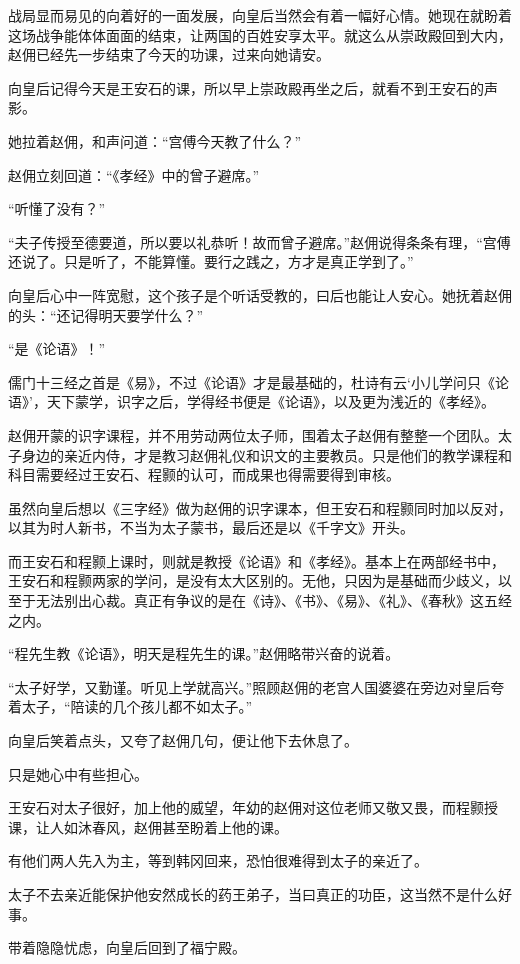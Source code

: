 战局显而易见的向着好的一面发展，向皇后当然会有着一幅好心情。她现在就盼着这场战争能体体面面的结束，让两国的百姓安享太平。就这么从崇政殿回到大内，赵佣已经先一步结束了今天的功课，过来向她请安。

向皇后记得今天是王安石的课，所以早上崇政殿再坐之后，就看不到王安石的声影。

她拉着赵佣，和声问道：“宫傅今天教了什么？”

赵佣立刻回道：“《孝经》中的曾子避席。”

“听懂了没有？”

“夫子传授至德要道，所以要以礼恭听！故而曾子避席。”赵佣说得条条有理，“宫傅还说了。只是听了，不能算懂。要行之践之，方才是真正学到了。”

向皇后心中一阵宽慰，这个孩子是个听话受教的，曰后也能让人安心。她抚着赵佣的头：“还记得明天要学什么？”

“是《论语》！”

 儒门十三经之首是《易》，不过《论语》才是最基础的，杜诗有云‘小儿学问只《论语》’，天下蒙学，识字之后，学得经书便是《论语》，以及更为浅近的《孝经》。

赵佣开蒙的识字课程，并不用劳动两位太子师，围着太子赵佣有整整一个团队。太子身边的亲近内侍，才是教习赵佣礼仪和识文的主要教员。只是他们的教学课程和科目需要经过王安石、程颢的认可，而成果也得需要得到审核。

虽然向皇后想以《三字经》做为赵佣的识字课本，但王安石和程颢同时加以反对，以其为时人新书，不当为太子蒙书，最后还是以《千字文》开头。

而王安石和程颢上课时，则就是教授《论语》和《孝经》。基本上在两部经书中，王安石和程颢两家的学问，是没有太大区别的。无他，只因为是基础而少歧义，以至于无法别出心裁。真正有争议的是在《诗》、《书》、《易》、《礼》、《春秋》这五经之内。

“程先生教《论语》，明天是程先生的课。”赵佣略带兴奋的说着。

“太子好学，又勤谨。听见上学就高兴。”照顾赵佣的老宫人国婆婆在旁边对皇后夸着太子，“陪读的几个孩儿都不如太子。”

向皇后笑着点头，又夸了赵佣几句，便让他下去休息了。

只是她心中有些担心。

王安石对太子很好，加上他的威望，年幼的赵佣对这位老师又敬又畏，而程颢授课，让人如沐春风，赵佣甚至盼着上他的课。

有他们两人先入为主，等到韩冈回来，恐怕很难得到太子的亲近了。

太子不去亲近能保护他安然成长的药王弟子，当曰真正的功臣，这当然不是什么好事。

带着隐隐忧虑，向皇后回到了福宁殿。

